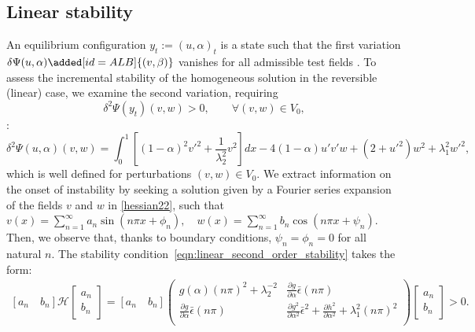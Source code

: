 \subsection{Linear stability}
An equilibrium configuration $y_t:=(u,\alpha)_t$ is a state such that the first variation $\delta \Psi(u,\alpha)\added[id=ALB]{(v, \beta)}$ vanishes for all admissible test fields . 
To assess the incremental stability of the homogeneous solution in the reversible (linear) case, we examine the  second variation, requiring
\begin{equation}
\delta^2 \Psi(y_t)(v,w)>0, \qquad  \forall (v,w)\in V_0,
\label{eqn:linear_second_order_stability}
\end{equation} 
  :
\begin{equation}
\delta^2 \Psi(u,\alpha)(v,w)=\int_0^1 \left[(1-\alpha)^2v'^2 
+\frac{1}{\lambda_2^2} v^2 \right]dx
- 4(1-\alpha)u' v'w+(2+ u'^2)w^2+\lambda_1^2w'^2, 
\label{hessian22}
\end{equation}
which is well defined for perturbations $(v, w)\in V_0$.
{We} extract information on the onset of instability by seeking a solution given by a Fourier series expansion of the fields $v$ and $w$ in \eqref{hessian22}, such that $v(x)=\sum_{n=1}^{\infty} a_{n} \sin \left(n \pi x+\phi_{n}\right), \quad w(x)=\sum_{n=1}^{\infty} b_{n} \cos \left(n \pi x+\psi_{n}\right)$. Then, we observe that, thanks to boundary conditions, $\psi_{n}=\phi_{n}=0$ for all natural $n$. The stability condition~\eqref{eqn:linear_second_order_stability}  takes the form:
\begin{align}\left[ a_n \quad b_n \right] \mathcal{H} \left[ \begin{array}{c} a_n \\ b_n \end{array} \right]=\left[ a_n \quad b_n \right]\left(
\begin{array}{cc}
g(\alpha)(n\pi)^2+\lambda_2^{-2}  & \frac{\partial g}{\partial \alpha}\bar\epsilon(n\pi)  \\
\frac{\partial g}{\partial \alpha}\bar\epsilon(n\pi)  &   \frac{\partial g^2}{\partial \alpha^2}\bar\epsilon^2+ \frac{\partial h^2}{\partial \alpha^2}+\lambda_1^2(n\pi)^2  \\
\end{array}
\right)\left[ \begin{array}{c} a_n \\ b_n \end{array} \right]>0.\label{hessian1}\end{align}
